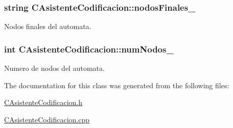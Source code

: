 \subsubsection[{\texorpdfstring{nodos\+Finales\+\_\+}{nodosFinales_}}]{\setlength{\rightskip}{0pt plus 5cm}string C\+Asistente\+Codificacion\+::nodos\+Finales\+\_\+\hspace{0.3cm}{\ttfamily [private]}}\hypertarget{classCAsistenteCodificacion_afa94c6d482da4f5eb193ddd7211db25f}{}\label{classCAsistenteCodificacion_afa94c6d482da4f5eb193ddd7211db25f}


Nodos finales del automata. 

\subsubsection[{\texorpdfstring{num\+Nodos\+\_\+}{numNodos_}}]{\setlength{\rightskip}{0pt plus 5cm}int C\+Asistente\+Codificacion\+::num\+Nodos\+\_\+\hspace{0.3cm}{\ttfamily [private]}}\hypertarget{classCAsistenteCodificacion_a3c77dcdb74837345c1da4a6a7051ee4e}{}\label{classCAsistenteCodificacion_a3c77dcdb74837345c1da4a6a7051ee4e}


Numero de nodos del automata. 



The documentation for this class was generated from the following files\+:\begin{DoxyCompactItemize}
\item 
\hyperlink{CAsistenteCodificacion_8h}{C\+Asistente\+Codificacion.\+h}\item 
\hyperlink{CAsistenteCodificacion_8cpp}{C\+Asistente\+Codificacion.\+cpp}\end{DoxyCompactItemize}
